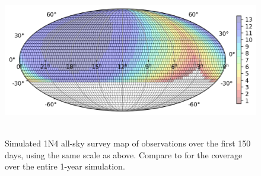 \begin{colsection}
\begin{figure}[p]
    \begin{center}
        \includegraphics[height=190pt]{images/survey_sims/150_1N4_lite_v2.png}
    \end{center}
    \caption[1N4 survey simulation observations over 150 days]{
        Simulated 1N4 all-sky survey map of observations over the first 150 days, using the same scale as  above. Compare to  for the coverage over the entire 1-year simulation.
    }\label{fig:survey_sim_1n4_150}
\end{figure}

\clearpage
\newpage

\end{colsection}


